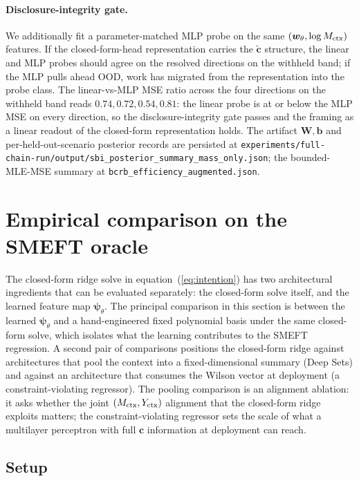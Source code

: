 \documentclass[11pt,a4paper]{article}
\newcommand{\psib}{\bm{\psi}}
\begin{document}
\paragraph{Disclosure-integrity gate.}
We additionally fit a parameter-matched MLP probe on the same $(\bm{w}_\theta, \log M_{\rm ctx})$ features. If the closed-form-head representation carries the $\tilde{\bm{c}}$ structure, the linear and MLP probes should agree on the resolved directions on the withheld band; if the MLP pulls ahead OOD, work has migrated from the representation into the probe class. The linear-vs-MLP MSE ratio across the four directions on the withheld band reads $0.74, 0.72, 0.54, 0.81$: the linear probe is at or below the MLP MSE on every direction, so the disclosure-integrity gate passes and the framing as a linear readout of the closed-form representation holds. The artifact $\bm{W}, \bm{b}$ and per-held-out-scenario posterior records are persisted at \texttt{experiments/full-chain-run/output/sbi\_posterior\_summary\_mass\_only.json}; the bounded-MLE-MSE summary at \texttt{bcrb\_efficiency\_augmented.json}.

\section{Empirical comparison on the SMEFT oracle}
\label{sec:empirical}

The closed-form ridge solve in equation~(\ref{eq:intention}) has two architectural ingredients that can be evaluated separately: the closed-form solve itself, and the learned feature map $\psib_\theta$. The principal comparison in this section is between the learned $\psib_\theta$ and a hand-engineered fixed polynomial basis under the same closed-form solve, which isolates what the learning contributes to the SMEFT regression. A second pair of comparisons positions the closed-form ridge against architectures that pool the context into a fixed-dimensional summary (Deep Sets) and against an architecture that consumes the Wilson vector at deployment (a constraint-violating regressor). The pooling comparison is an alignment ablation: it asks whether the joint $(M_{\rm ctx}, Y_{\rm ctx})$ alignment that the closed-form ridge exploits matters; the constraint-violating regressor sets the scale of what a multilayer perceptron with full $\bm{c}$ information at deployment can reach.

\subsection{Setup}
\end{document}
